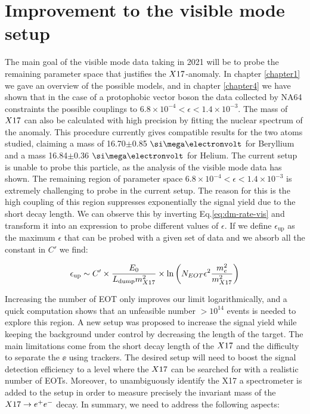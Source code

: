 \section{Improvement to the visible mode setup}
\label{ch5:sec:new-vismode-setup}

The main goal of the visible mode data taking in 2021 will be to probe the remaining parameter space that justifies the $X17$-anomaly. In chapter \ref{chapter1} we gave an overview of the possible models, and in chapter \ref{chapter4} we have shown that in the case of a protophobic vector boson the data collected by NA64 constraints the possible couplings to $6.8 \times 10^{-4} < \epsilon < 1.4 \times 10^{-3}$. The mass of $X17$ can also be calculated with high precision by fitting the nuclear spectrum of the anomaly. This procedure currently gives compatible results for the two atoms studied, claiming a mass of 16.70$\pm$0.85 $\mev$ for Beryllium and a mass 16.84$\pm$0.36 $\mev$ for Helium. The current setup is unable to probe this particle, as the analysis of the visible mode data has shown. The remaining region of parameter space $6.8 \times 10^{-4} < \epsilon < 1.4 \times 10^{-3}$ is extremely challenging to probe in the current setup. The reason for this is the high coupling of this region suppresses exponentially the signal yield due to the short decay length. We can observe this by inverting Eq.\ref{eq:dm-rate-vis} and transform it into an expression to probe different values of $\epsilon$. If we define $\epsilon_{\textrm{up}}$ as the maximum $\epsilon$ that can be probed with a given set of data and we absorb all the constant in $C'$ we find:

\begin{equation}
  \label{eq:x17-coverage}
  \epsilon_{\textrm{up}} \sim C' \times \frac{E_0}{L_{\textrm{dump}}m^2_{X17}} \times \ln{\left(N_{EOT} \epsilon^2 \frac{m_e^2}{m_{X17}^2}\right)}
\end{equation}

Increasing the number of EOT only improves our limit logarithmically, and a quick computation shows that an unfeasible number $>10^{14}$ events is needed to explore this region. A new setup was proposed to increase the signal yield while keeping the background under control by decreasing the length of the target. The main limitations come from the short decay length of the $X17$ and the difficulty to separate the $\ee$ using trackers. The desired setup will need to boost the signal detection efficiency to a level where the $X17$ can be searched for with a realistic number of EOTs. Moreover, to unambiguously identify the X17 a spectrometer is added to the setup in order to measure precisely the invariant mass of the $X17 \rightarrow e^+ e^-$ decay. In summary, we need to address the following aspects:

